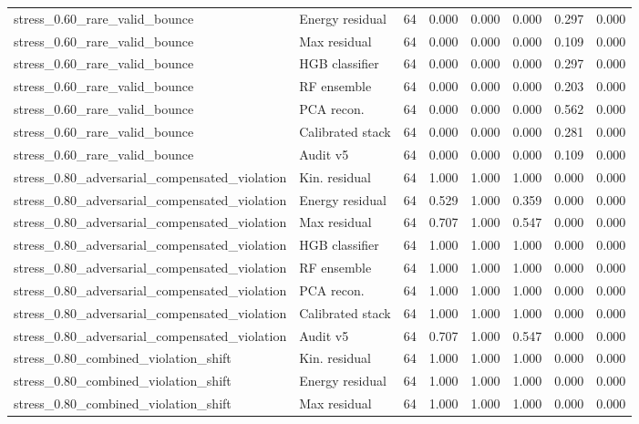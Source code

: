 {\begin{longtable}{llrrrrrr}
stress\_0.60\_rare\_valid\_bounce & Energy residual & 64 & 0.000 & 0.000 & 0.000 & 0.297 & 0.000 \\
stress\_0.60\_rare\_valid\_bounce & Max residual & 64 & 0.000 & 0.000 & 0.000 & 0.109 & 0.000 \\
stress\_0.60\_rare\_valid\_bounce & HGB classifier & 64 & 0.000 & 0.000 & 0.000 & 0.297 & 0.000 \\
stress\_0.60\_rare\_valid\_bounce & RF ensemble & 64 & 0.000 & 0.000 & 0.000 & 0.203 & 0.000 \\
stress\_0.60\_rare\_valid\_bounce & PCA recon. & 64 & 0.000 & 0.000 & 0.000 & 0.562 & 0.000 \\
stress\_0.60\_rare\_valid\_bounce & Calibrated stack & 64 & 0.000 & 0.000 & 0.000 & 0.281 & 0.000 \\
stress\_0.60\_rare\_valid\_bounce & Audit v5 & 64 & 0.000 & 0.000 & 0.000 & 0.109 & 0.000 \\
stress\_0.80\_adversarial\_compensated\_violation & Kin. residual & 64 & 1.000 & 1.000 & 1.000 & 0.000 & 0.000 \\
stress\_0.80\_adversarial\_compensated\_violation & Energy residual & 64 & 0.529 & 1.000 & 0.359 & 0.000 & 0.000 \\
stress\_0.80\_adversarial\_compensated\_violation & Max residual & 64 & 0.707 & 1.000 & 0.547 & 0.000 & 0.000 \\
stress\_0.80\_adversarial\_compensated\_violation & HGB classifier & 64 & 1.000 & 1.000 & 1.000 & 0.000 & 0.000 \\
stress\_0.80\_adversarial\_compensated\_violation & RF ensemble & 64 & 1.000 & 1.000 & 1.000 & 0.000 & 0.000 \\
stress\_0.80\_adversarial\_compensated\_violation & PCA recon. & 64 & 1.000 & 1.000 & 1.000 & 0.000 & 0.000 \\
stress\_0.80\_adversarial\_compensated\_violation & Calibrated stack & 64 & 1.000 & 1.000 & 1.000 & 0.000 & 0.000 \\
stress\_0.80\_adversarial\_compensated\_violation & Audit v5 & 64 & 0.707 & 1.000 & 0.547 & 0.000 & 0.000 \\
stress\_0.80\_combined\_violation\_shift & Kin. residual & 64 & 1.000 & 1.000 & 1.000 & 0.000 & 0.000 \\
stress\_0.80\_combined\_violation\_shift & Energy residual & 64 & 1.000 & 1.000 & 1.000 & 0.000 & 0.000 \\
stress\_0.80\_combined\_violation\_shift & Max residual & 64 & 1.000 & 1.000 & 1.000 & 0.000 & 0.000 \\

\end{longtable}}
